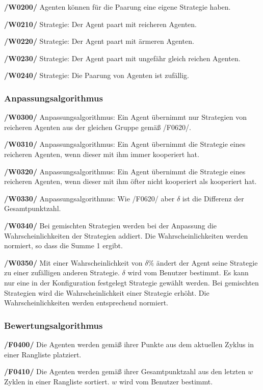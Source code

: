 \textbf{/W0200/}
Agenten können für die Paarung eine eigene Strategie haben.

\textbf{/W0210/} 
Strategie: Der Agent paart mit reicheren Agenten.

\textbf{/W0220/}
Strategie: Der Agent paart mit ärmeren Agenten.

\textbf{/W0230/}
Strategie: Der Agent paart mit ungefähr gleich reichen Agenten.

\textbf{/W0240/}
Strategie: Die Paarung von Agenten ist zufällig.

\subsubsection{Anpassungsalgorithmus}

\textbf{/W0300/}
Anpassungsalgorithmus: Ein Agent übernimmt nur Strategien von reicheren Agenten aus der gleichen Gruppe gemäß /F0620/.

\textbf{/W0310/}
Anpassungsalgorithmus: Ein Agent übernimmt die Strategie eines reicheren Agenten, wenn dieser mit ihm immer kooperiert hat.

\textbf{/W0320/}
Anpassungsalgorithmus: Ein Agent übernimmt die Strategie eines reicheren Agenten, wenn dieser mit ihm öfter nicht kooperiert als kooperiert hat.

\textbf{/W0330/}
Anpassungsalgorithmus: Wie /F0620/ aber $\delta$ ist die Differenz der Gesamtpunktzahl.

\textbf{/W0340/}
Bei gemischten Strategien werden bei der Anpassung die Wahrscheinlichkeiten der Strategien addiert. Die Wahrscheinlichkeiten werden normiert, so dass die Summe 1 ergibt.

\textbf{/W0350/}
Mit einer Wahrscheinlichkeit von $\delta\%$ ändert der Agent seine Strategie zu einer zufälligen anderen Strategie. $\delta$ wird vom Benutzer bestimmt. Es kann nur eine in der Konfiguration festgelegt Strategie gewählt werden. Bei gemischten Strategien wird die Wahrscheinlichkeit einer Strategie erhöht. Die Wahrscheinlichkeiten werden entsprechend normiert.

\subsubsection{Bewertungsalgorithmus}

\textbf{/F0400/}
Die Agenten werden gemäß ihrer Punkte aus dem aktuellen Zyklus in einer Rangliste platziert.

\textbf{/F0410/}
Die Agenten werden gemäß ihrer Gesamtpunktzahl aus den letzten $w$ Zyklen in einer Rangliste sortiert. $w$ wird vom Benutzer bestimmt.

